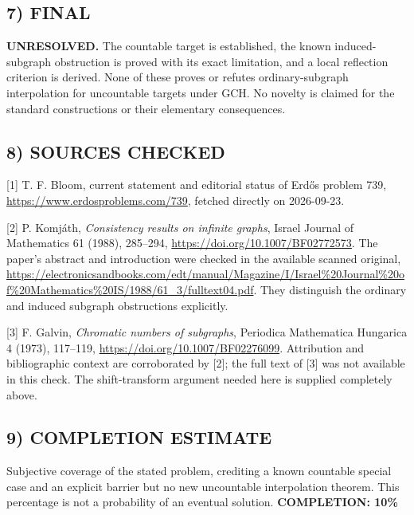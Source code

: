 \subsection*{7) FINAL}
\textbf{UNRESOLVED.} The countable target is established, the known induced-subgraph obstruction is proved with its exact limitation, and a local reflection criterion is derived. None of these proves or refutes ordinary-subgraph interpolation for uncountable targets under GCH. No novelty is claimed for the standard constructions or their elementary consequences.

\subsection*{8) SOURCES CHECKED}
[1] T. F. Bloom, current statement and editorial status of Erd\H{o}s problem 739, \url{https://www.erdosproblems.com/739}, fetched directly on 2026-09-23.

[2] P. Komj\'ath, \emph{Consistency results on infinite graphs}, Israel Journal of Mathematics 61 (1988), 285--294, \url{https://doi.org/10.1007/BF02772573}. The paper's abstract and introduction were checked in the available scanned original, \url{https://electronicsandbooks.com/edt/manual/Magazine/I/Israel%20Journal%20of%20Mathematics%20IS/1988/61_3/fulltext04.pdf}. They distinguish the ordinary and induced subgraph obstructions explicitly.

[3] F. Galvin, \emph{Chromatic numbers of subgraphs}, Periodica Mathematica Hungarica 4 (1973), 117--119, \url{https://doi.org/10.1007/BF02276099}. Attribution and bibliographic context are corroborated by [2]; the full text of [3] was not available in this check. The shift-transform argument needed here is supplied completely above.

\subsection*{9) COMPLETION ESTIMATE}
Subjective coverage of the stated problem, crediting a known countable special case and an explicit barrier but no new uncountable interpolation theorem. This percentage is not a probability of an eventual solution.
\textbf{COMPLETION: 10\%}
